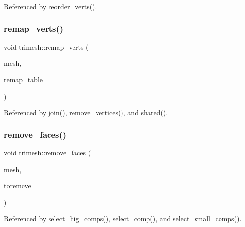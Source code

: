 Referenced by reorder\+\_\+verts().

\mbox{\label{namespacetrimesh_a21a4ec76f2dfeff182e6170eab0ce31b}} 
\subsubsection{\texorpdfstring{remap\+\_\+verts()}{remap\_verts()}\hspace{0.1cm}{\footnotesize\ttfamily [2/2]}}
{\footnotesize\ttfamily \hyperlink{namespacetrimesh_a784ddfd979e1c579bda795a8edfc3f43}{void} trimesh\+::remap\+\_\+verts (\begin{DoxyParamCaption}\item[{\hyperlink{classtrimesh_1_1TriMesh}{Tri\+Mesh} $\ast$}]{mesh,  }\item[{const \+::std\+::vector$<$ int $>$ \&}]{remap\+\_\+table }\end{DoxyParamCaption})}



Referenced by join(), remove\+\_\+vertices(), and shared().

\mbox{\label{namespacetrimesh_a8aa31b33984576eec08cbddfd59456f4}} 
\subsubsection{\texorpdfstring{remove\+\_\+faces()}{remove\_faces()}\hspace{0.1cm}{\footnotesize\ttfamily [1/2]}}
{\footnotesize\ttfamily \hyperlink{namespacetrimesh_a784ddfd979e1c579bda795a8edfc3f43}{void} trimesh\+::remove\+\_\+faces (\begin{DoxyParamCaption}\item[{\hyperlink{classtrimesh_1_1TriMesh}{Tri\+Mesh} $\ast$}]{mesh,  }\item[{const \+::std\+::vector$<$ bool $>$ \&}]{toremove }\end{DoxyParamCaption})}



Referenced by select\+\_\+big\+\_\+comps(), select\+\_\+comp(), and select\+\_\+small\+\_\+comps().

\mbox{\label{namespacetrimesh_ad247ad89293bd31564b04db8a913de23}} 
